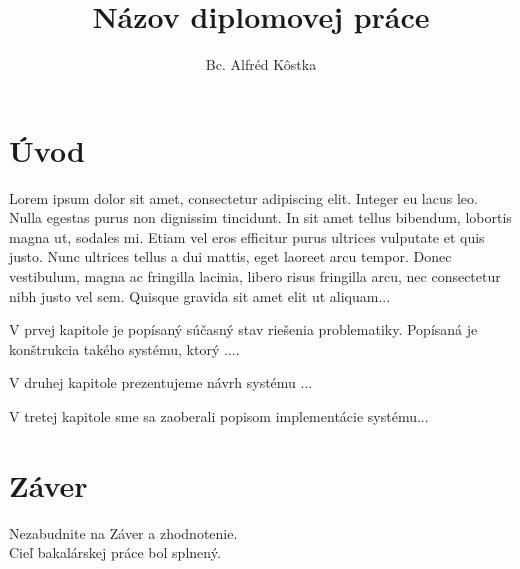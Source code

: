 \documentclass[12pt]{article}
\title{Názov diplomovej práce}
\author{Bc. Alfréd Kôstka}
\begin{document}



%

%




\tableofcontents
\pagebreak
\listoffigures
\pagebreak

\glsaddall %
\printglossary[type=\acronymtype,title={Zoznam skratiek a značiek}]



\section{Úvod}
Lorem ipsum dolor sit amet, consectetur adipiscing elit. Integer eu lacus leo. Nulla egestas purus non dignissim tincidunt. In sit amet tellus bibendum, lobortis magna ut, sodales mi. Etiam vel eros efficitur purus ultrices vulputate et quis justo. Nunc ultrices tellus a dui mattis, eget laoreet arcu tempor. Donec vestibulum, magna ac fringilla lacinia, libero risus fringilla arcu, nec consectetur nibh justo vel sem. Quisque gravida sit amet elit ut aliquam...\par
\vspace{1em}
\noindent
V prvej kapitole je popísaný súčasný stav riešenia problematiky. Popísaná je konštrukcia takého systému, ktorý ....

\noindent
V druhej kapitole prezentujeme návrh systému ...

\noindent
V tretej kapitole sme sa zaoberali popisom implementácie systému...

 

\section{Záver}
Nezabudnite na Záver a zhodnotenie.\\  
Cieľ bakalárskej práce bol splnený.


\newpage
\printbibliography[title={Použitá literatúra}]


\end{document}
